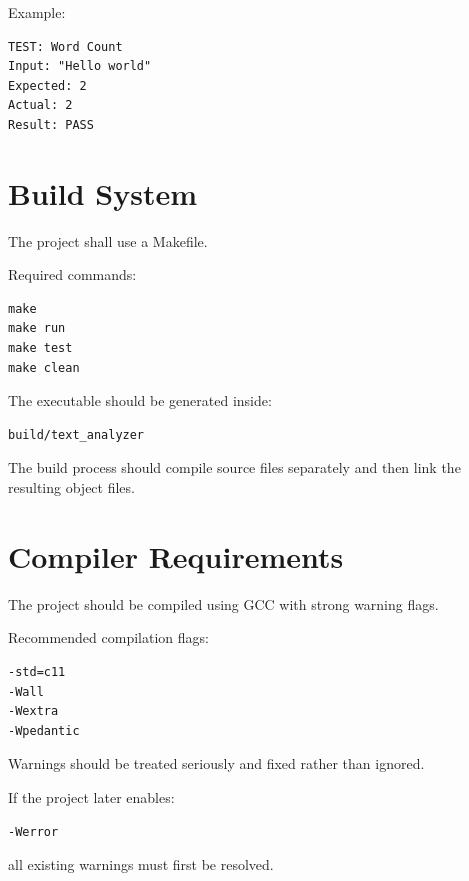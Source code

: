 \documentclass[12pt,a4paper]{article}
\begin{document}
Example:

\begin{verbatim}
TEST: Word Count
Input: "Hello world"
Expected: 2
Actual: 2
Result: PASS
\end{verbatim}


\section{Build System}

The project shall use a Makefile.

Required commands:

\begin{verbatim}
make
make run
make test
make clean
\end{verbatim}

The executable should be generated inside:

\begin{verbatim}
build/text_analyzer
\end{verbatim}

The build process should compile source files separately and then link
the resulting object files.


\section{Compiler Requirements}

The project should be compiled using GCC with strong warning flags.

Recommended compilation flags:

\begin{verbatim}
-std=c11
-Wall
-Wextra
-Wpedantic
\end{verbatim}

Warnings should be treated seriously and fixed rather than ignored.

If the project later enables:

\begin{verbatim}
-Werror
\end{verbatim}

all existing warnings must first be resolved.
\end{document}
